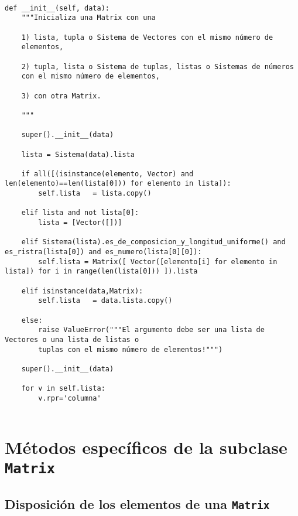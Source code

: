 \documentclass[11pt]{report}
\begin{document}
\begin{verbatim}

def __init__(self, data):
    """Inicializa una Matrix con una

    1) lista, tupla o Sistema de Vectores con el mismo número de
    elementos,
    
    2) tupla, lista o Sistema de tuplas, listas o Sistemas de números
    con el mismo número de elementos,
    
    3) con otra Matrix.

    """

    super().__init__(data)
    
    lista = Sistema(data).lista

    if all([(isinstance(elemento, Vector) and len(elemento)==len(lista[0])) for elemento in lista]):
        self.lista   = lista.copy()

    elif lista and not lista[0]:
        lista = [Vector([])]
        
    elif Sistema(lista).es_de_composicion_y_longitud_uniforme() and es_ristra(lista[0]) and es_numero(lista[0][0]):
        self.lista = Matrix([ Vector([elemento[i] for elemento in lista]) for i in range(len(lista[0])) ]).lista

    elif isinstance(data,Matrix):
        self.lista   = data.lista.copy()

    else: 
        raise ValueError("""El argumento debe ser una lista de Vectores o una lista de listas o
        tuplas con el mismo número de elementos!""")
    
    super().__init__(data)

    for v in self.lista:
        v.rpr='columna'
        
\end{verbatim}

\section{Métodos específicos de la subclase \texttt{Matrix}}
\label{sec:org1f96384}
\subsection{Disposición de los elementos de una \texttt{Matrix}}
\label{sec:org05d5d82}
\end{document}

